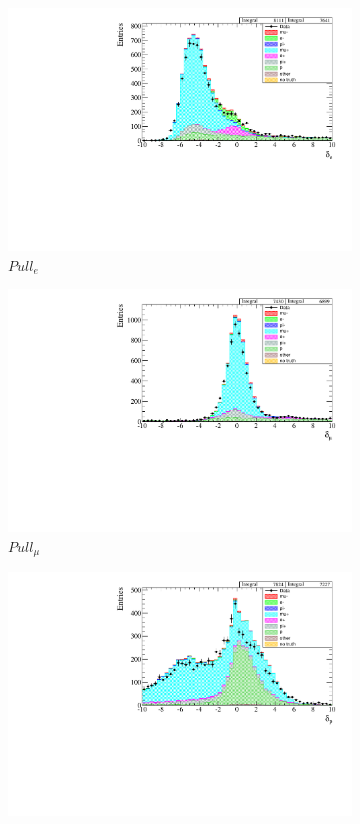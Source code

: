 \begin{figure}[!h]
	\begin{subfigure}[t]{0.32\textwidth}
		\includegraphics[width=\textwidth]{figures/numu/Cuts/numubar/presel_pullele_part}
		\caption{$Pull_e$}
	\end{subfigure}
	\begin{subfigure}[t]{0.32\textwidth}
		\includegraphics[width=\textwidth]{figures/numu/Cuts/numubar/presel_pullmu_part}
		\caption{$Pull_\mu$}
	\end{subfigure}
	\begin{subfigure}[t]{0.32\textwidth}
		\includegraphics[width=\textwidth]{figures/numu/Cuts/numubar/presel_pullp_part}

\end{subfigure}
\end{figure}
